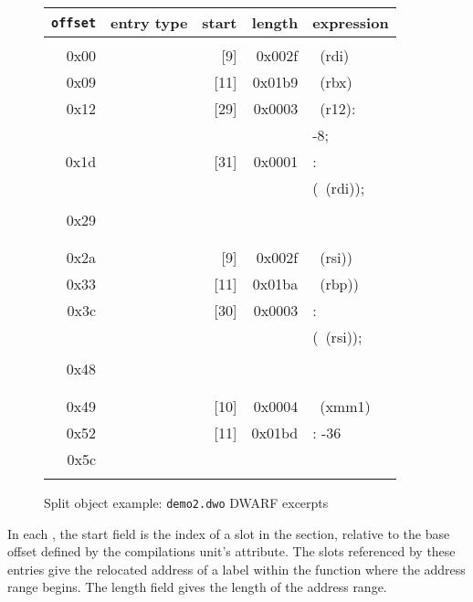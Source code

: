 \begin{figure}
\begin{dwflisting}
\begin{tabular}{rlrrl}
\texttt{offset} & entry type & start & length & expression \\
\hline \\
0x00 & \DWLLEstartlengthentry &  [9] & 0x002f & \DWOPregfive~(rdi) \\
0x09 & \DWLLEstartlengthentry & [11] & 0x01b9 & \DWOPregthree~(rbx) \\
0x12 & \DWLLEstartlengthentry & [29] & 0x0003 & \DWOPbregtwelve~(r12):\\
&&&& -8; \DWOPstackvalue \\
0x1d & \DWLLEstartlengthentry & [31] & 0x0001 & \DWOPentryvalue: \\
&&&& (\DWOPregfive~(rdi)); \\
&&&& \DWOPstackvalue \\
0x29 & \DWLLEendoflistentry &&& \\
\\   & \hhline{-} &&& \\
0x2a & \DWLLEstartlengthentry &  [9] & 0x002f & \DWOPregfour~(rsi)) \\
0x33 & \DWLLEstartlengthentry & [11] & 0x01ba & \DWOPregsix~(rbp)) \\
0x3c & \DWLLEstartlengthentry & [30] & 0x0003 & \DWOPentryvalue: \\
&&&& (\DWOPregfour~(rsi)); \\
&&&& \DWOPstackvalue \\
0x48 & \DWLLEendoflistentry &&& \\
\\   & \hhline{-} &&& \\
0x49 & \DWLLEstartlengthentry & [10] & 0x0004 & \DWOPregeighteen~(xmm1) \\
0x52 & \DWLLEstartlengthentry & [11] & 0x01bd & \DWOPfbreg: -36 \\
0x5c & \DWLLEendoflistentry &&& \\
&&&& \\
\end{tabular}
\end{dwflisting}
\caption{Split object example: \texttt{demo2.dwo} DWARF \dotdebuglocdwo{} excerpts}
\label{fig:splitobjectexampledemo2dwodwarfdebuglocdwoexcerpts}
\end{figure}

In each \DWLLEstartlengthentry{}, the start field is the index
of a slot in the \dotdebugaddr{} section, relative to the base
offset defined by the compilations unit's \DWATaddrbase{}
attribute. The \dotdebugaddr{} slots referenced by these entries give
the relocated address of a label within the function where the
address range begins. The length field gives the length of the
address range.

